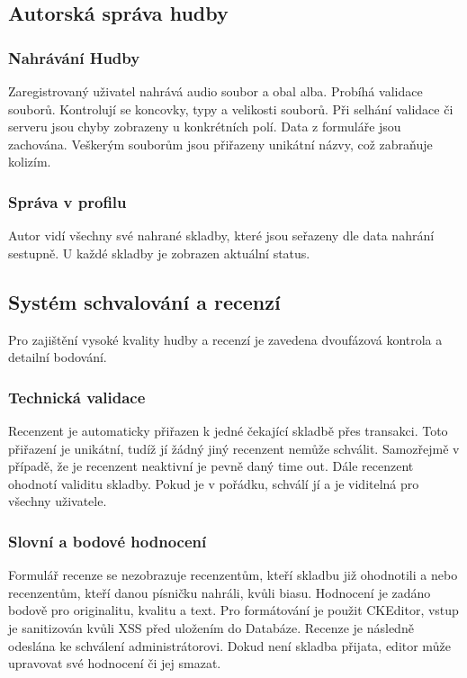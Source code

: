 \documentclass[12pt, a4paper]{article}
\begin{document}
\subsection{Autorská správa hudby}
\subsubsection{Nahrávání Hudby}
Zaregistrovaný uživatel nahrává audio soubor a obal alba. 
Probíhá validace souborů. Kontrolují se koncovky, typy a velikosti souborů.
Při selhání validace či serveru jsou chyby zobrazeny u konkrétních polí.
Data z formuláře jsou zachována.
Veškerým souborům jsou přiřazeny unikátní názvy, což zabraňuje kolizím.

\subsubsection{Správa v profilu}
Autor vidí všechny své nahrané skladby, které jsou seřazeny dle data nahrání sestupně.
U každé skladby je zobrazen aktuální status.

\subsection{Systém schvalování a recenzí}
Pro zajištění vysoké kvality hudby a recenzí je zavedena dvoufázová kontrola a detailní bodování.
\subsubsection{Technická validace}
Recenzent je automaticky přiřazen k jedné čekající skladbě přes transakci. Toto přiřazení je unikátní, tudíž jí žádný jiný recenzent nemůže schválit.
Samozřejmě v případě, že je recenzent neaktivní je pevně daný time out.
Dále recenzent ohodnotí validitu skladby. Pokud je v pořádku, schválí jí a je viditelná pro všechny uživatele.

\subsubsection{Slovní a bodové hodnocení}
Formulář recenze se nezobrazuje recenzentům, kteří skladbu již ohodnotili a nebo recenzentům, kteří danou písničku nahráli, kvůli biasu.
Hodnocení je zadáno bodově pro originalitu, kvalitu a text. Pro formátování je použit CKEditor, vstup je sanitizován kvůli XSS před uložením do Databáze.
Recenze je následně odeslána ke schválení administrátorovi. Dokud není skladba přijata, editor může upravovat své hodnocení či jej smazat.
\end{document}
